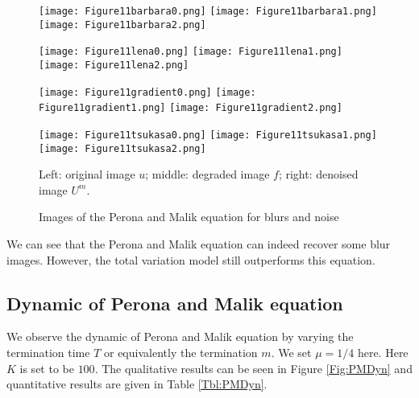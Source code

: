 \documentclass[english, nochinese]{pnote}
\begin{document}
\begin{figure}[htbp]
{
\centering

\texttt{[image: Figure11barbara0.png]}
\texttt{[image: Figure11barbara1.png]}
\texttt{[image: Figure11barbara2.png]}

\texttt{[image: Figure11lena0.png]}
\texttt{[image: Figure11lena1.png]}
\texttt{[image: Figure11lena2.png]}

\texttt{[image: Figure11gradient0.png]}
\texttt{[image: Figure11gradient1.png]}
\texttt{[image: Figure11gradient2.png]}

\texttt{[image: Figure11tsukasa0.png]}
\texttt{[image: Figure11tsukasa1.png]}
\texttt{[image: Figure11tsukasa2.png]}

\caption{Images of the Perona and Malik equation for blurs and noise}
\label{Fig:PMEnh}
}
{
\footnotesize Left: original image $u$; middle: degraded image $f$; right: denoised image $U^m$.
}
\end{figure}

We can see that the Perona and Malik equation can indeed recover some blur images. However, the total variation model still outperforms this equation.

\subsection{Dynamic of Perona and Malik equation}

We observe the dynamic of Perona and Malik equation by varying the termination time $T$ or equivalently the termination $m$. We set $ \mu = 1 / 4 $ here. Here $K$ is set to be $100$. The qualitative results can be seen in Figure \ref{Fig:PMDyn} and quantitative results are given in Table \ref{Tbl:PMDyn}.
\end{document}
